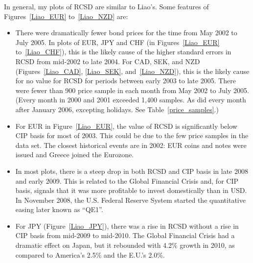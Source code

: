 In general, my plots of RCSD are similar to Liao's.  Some features of Figures~\ref{Liao_EUR} to~\ref{Liao_NZD} are:
\begin{itemize}

\item There were dramatically fewer bond prices for the time from May 2002 to July 2005.  In plots of EUR, JPY and CHF (in Figures~\ref{Liao_EUR} to~\ref{Liao_CHF}), this is the likely cause of the higher standard errors in RCSD from mid-2002 to late 2004.  For CAD, SEK, and NZD (Figures~\ref{Liao_CAD}, \ref{Liao_SEK}, and~\ref{Liao_NZD}), this is the likely cause for no value for RCSD for periods between early 2003 to late 2005.
There were fewer than 900 price sample in each month from May 2002 to July 2005.  (Every month in 2000 and 2001 exceeded 1,400 samples.  As did every month after January 2006, excepting holidays.  See Table~\ref{price_samples}.)  




\item For EUR in Figure~\ref{Liao_EUR}, the value of RCSD is significantly below CIP basis for most of 2003.  This could be due to the few price samples in the data set.  The closest historical events are in 2002: EUR coins and notes were issued and Greece joined the Eurozone.  

\item In most plots, there is a steep drop in both RCSD and CIP basis in late 2008 and early 2009.  This is related to the Global Financial Crisis and, for CIP basis, signals that it was more profitable to invest domestically than in USD.  In November 2008, the U.S. Federal Reserve System started the quantitative easing later known as ``QE1''.  

\item For JPY (Figure~\ref{Liao_JPY}), there was a rise in RCSD without a rise in CIP basis from mid-2009 to mid-2010.  The Global Financial Crisis had a dramatic effect on Japan, but it rebounded with 4.2\% growth in 2010, as compared to America's 2.5\% and the E.U.'s 2.0\%. 


\end{itemize}
